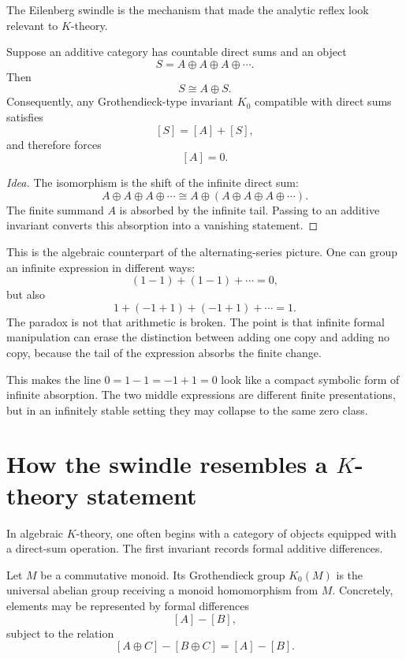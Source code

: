 The Eilenberg swindle is the mechanism that made the analytic reflex look relevant to \(K\)-theory.

\begin{theorem}
Suppose an additive category has countable direct sums and an object
\[
  S=A\oplus A\oplus A\oplus\cdots.
\]
Then
\[
  S\cong A\oplus S.
\]
Consequently, any Grothendieck-type invariant \(K_0\) compatible with direct sums satisfies
\[
  [S]=[A]+[S],
\]
and therefore forces
\[
  [A]=0.
\]
\end{theorem}

\begin{proof}[Idea]
The isomorphism is the shift of the infinite direct sum:
\[
  A\oplus A\oplus A\oplus\cdots
  \cong
  A\oplus(A\oplus A\oplus A\oplus\cdots).
\]
The finite summand \(A\) is absorbed by the infinite tail.  Passing to an additive invariant converts this absorption into a vanishing statement.
\end{proof}

This is the algebraic counterpart of the alternating-series picture.  One can group an infinite expression in different ways:
\[
  (1-1)+(1-1)+\cdots=0,
\]
but also
\[
  1+(-1+1)+(-1+1)+\cdots=1.
\]
The paradox is not that arithmetic is broken.  The point is that infinite formal manipulation can erase the distinction between adding one copy and adding no copy, because the tail of the expression absorbs the finite change.

\begin{remark}
This makes the line \(0=1-1=-1+1=0\) look like a compact symbolic form of infinite absorption.  The two middle expressions are different finite presentations, but in an infinitely stable setting they may collapse to the same zero class.
\end{remark}

\section[How the swindle resembles a K-theory statement]{How the swindle resembles a \(K\)-theory statement}

In algebraic \(K\)-theory, one often begins with a category of objects equipped with a direct-sum operation.  The first invariant records formal additive differences.

\begin{definition}
Let \(M\) be a commutative monoid.  Its Grothendieck group \(K_0(M)\) is the universal abelian group receiving a monoid homomorphism from \(M\).  Concretely, elements may be represented by formal differences
\[
  [A]-[B],
\]
subject to the relation
\[
  [A\oplus C]-[B\oplus C]=[A]-[B].
\]
\end{definition}

